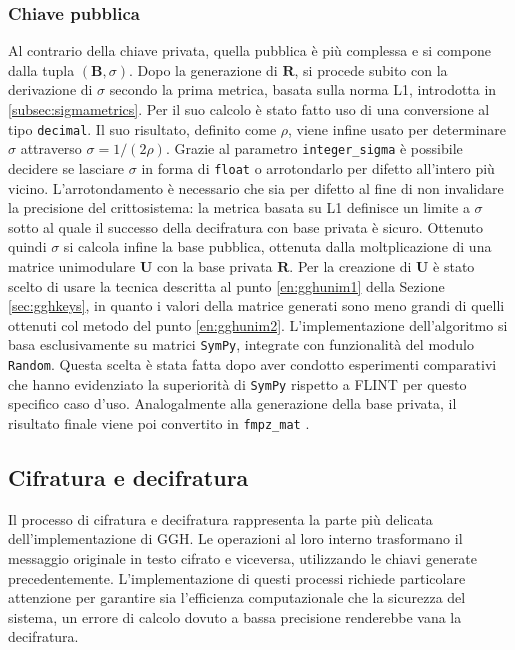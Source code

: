 \subsubsection{Chiave pubblica}
Al contrario della chiave privata, quella pubblica è più complessa e si compone dalla tupla
$(\mathbf{B}, \sigma)$.
Dopo la generazione di $\mathbf{R}$, si procede subito con la derivazione di $\sigma$ secondo 
la prima metrica, basata sulla norma L1, introdotta in \ref{subsec:sigmametrics}. 
Per il suo calcolo 
è stato fatto uso di una conversione al tipo \texttt{decimal}. Il suo risultato, 
definito come $\rho$, viene infine usato per determinare $\sigma$ attraverso 
$\sigma = 1 / (2\rho)$. Grazie al parametro \texttt{integer\_sigma} è possibile decidere
se lasciare $\sigma$ in forma di \texttt{float} o arrotondarlo per difetto all'intero più vicino.
L'arrotondamento è necessario che sia per difetto al fine di non invalidare la precisione 
del crittosistema: la metrica basata su L1 definisce un limite a $\sigma$ sotto al quale
il successo della decifratura con base privata è sicuro. Ottenuto quindi $\sigma$ si calcola infine
la base pubblica, ottenuta dalla moltplicazione di una matrice unimodulare $\mathbf{U}$ con
la base privata $\mathbf{R}$. Per la creazione di $\mathbf{U}$ è stato scelto di usare
la tecnica descritta al punto \ref{en:gghunim1} della Sezione \ref{sec:gghkeys}, in quanto
i valori della matrice generati sono meno grandi di quelli ottenuti col metodo del punto
\ref{en:gghunim2}.
L'implementazione dell'algoritmo si basa esclusivamente su matrici \texttt{SymPy}, integrate 
con funzionalità del modulo \texttt{Random}. Questa scelta è stata fatta dopo aver condotto 
esperimenti comparativi che hanno evidenziato la superiorità di \texttt{SymPy} rispetto a FLINT 
per questo specifico caso d'uso. Analogalmente alla generazione della base privata,
il risultato finale viene poi convertito in \texttt{fmpz\_mat} .

\subsection{Cifratura e decifratura}

Il processo di cifratura e decifratura rappresenta la parte più delicata dell'implementazione di GGH.
Le operazioni al loro interno trasformano il messaggio originale in testo cifrato e viceversa, 
utilizzando le chiavi generate precedentemente. L'implementazione di questi processi 
richiede particolare attenzione per garantire sia l'efficienza computazionale che la 
sicurezza del sistema, un errore di calcolo dovuto a bassa precisione renderebbe vana 
la decifratura.

